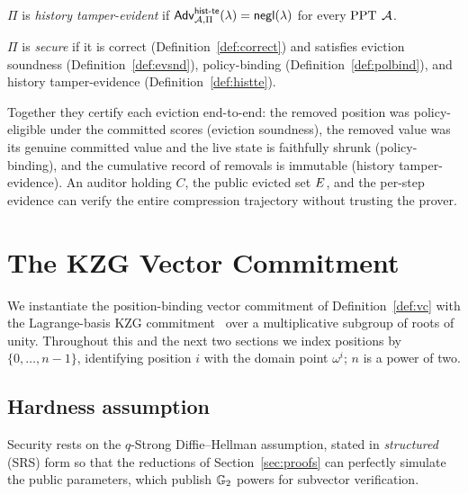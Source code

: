 \begin{definition}\label{def:histte}
$\Pi$ is \emph{history tamper-evident} if
$\mathsf{Adv}^{\mathsf{hist\text{-}te}}_{\mathcal{A},\Pi}(\lambda)=\mathsf{negl}(\lambda)$ for every $\mathrm{PPT}$ $\mathcal{A}$.
\end{definition}

\begin{definition}\label{def:secure}
$\Pi$ is \emph{secure} if it is correct (Definition~\ref{def:correct}) and
satisfies eviction soundness (Definition~\ref{def:evsnd}), policy-binding
(Definition~\ref{def:polbind}), and history tamper-evidence
(Definition~\ref{def:histte}).
\end{definition}

\begin{remark}
Together they certify each eviction end-to-end: the removed position was
policy-eligible under the committed scores (eviction soundness), the removed
value was its genuine committed value and the live state is faithfully shrunk
(policy-binding), and the cumulative record of removals is immutable (history
tamper-evidence). An auditor holding $C$, the public evicted set $E$, and
the per-step evidence can verify the entire compression trajectory without
trusting the prover.
\end{remark}

\section{The KZG Vector Commitment}\label{sec:kzgvc}

We instantiate the position-binding vector commitment of
Definition~\ref{def:vc} with the Lagrange-basis KZG commitment~\cite{kzg} over a
multiplicative subgroup of roots of unity. Throughout this and the next two
sections we index positions by $\{0,\dots,n-1\}$, identifying position $i$ with
the domain point $\omega^{i}$; $n$ is a power of two.

\subsection{Hardness assumption}

Security rests on the $q$-Strong Diffie--Hellman assumption, stated in
\emph{structured} (SRS) form so that the reductions of
Section~\ref{sec:proofs} can perfectly simulate the public parameters, which
publish $\mathbb{G}_2$ powers for subvector verification.

